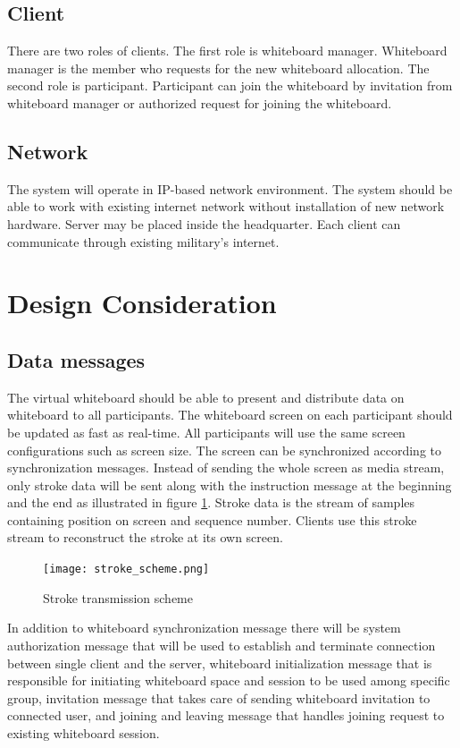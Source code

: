 \documentclass[conference]{IEEEtran}
\begin{document}
\subsection{Client}
There are two roles of clients. The first role is whiteboard manager. Whiteboard manager is the member who requests for the new whiteboard allocation. The second role is participant. Participant can join the whiteboard by invitation from whiteboard manager or authorized request for joining the whiteboard. 
\subsection{Network}
The system will operate in IP-based network environment. The system should be able to work with existing internet network without installation of new network hardware.  Server may be placed inside the headquarter. Each client can communicate through existing military's internet. 


\section{Design Consideration}
\subsection{Data messages}
The virtual whiteboard should be able to present and distribute data on whiteboard to all participants. The whiteboard screen on each participant should be updated as fast as real-time. All participants will use the same screen configurations such as screen size. The screen can be synchronized according to synchronization messages. Instead of sending the whole screen as media stream, only stroke data will be sent along with the instruction message at the beginning and the end as illustrated in figure \ref{fig:2}. Stroke data is the stream of samples containing position on screen and sequence number. Clients use this stroke stream to reconstruct the stroke at its own screen. 

\begin{figure}[h]
\begin{center}
\texttt{[image: stroke\_scheme.png]}
\caption{Stroke transmission scheme}
\label{fig:2}
\end{center}
\end{figure}

In addition to whiteboard synchronization message there will be system authorization message that will be used to establish and terminate connection between single client and the server, whiteboard initialization message that is responsible for initiating whiteboard space and session to be used among specific group, invitation message that takes care of sending whiteboard invitation to connected user, and joining and leaving message that handles joining request to existing whiteboard session.
\end{document}

